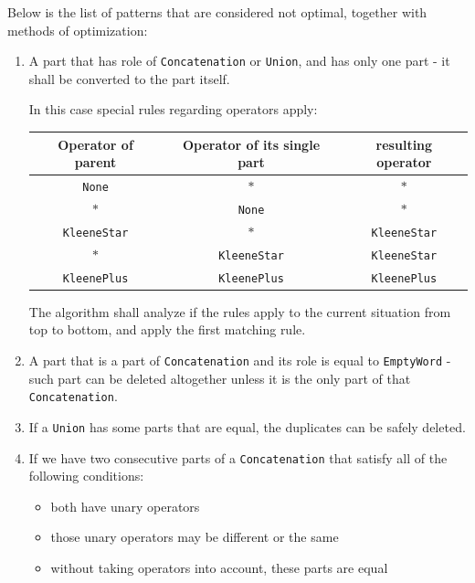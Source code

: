\documentclass{article}
\begin{document}
Below is the list of patterns that are considered not optimal, together with methods of optimization:
\begin{enumerate}

  \item A part that has role of \verb|Concatenation| or \verb|Union|, and has only one part - it
  shall be converted to the part itself.

  In this case special rules regarding operators apply:

  \noindent
  \begin{tabular}{c|c|c}
  Operator of parent & Operator of its single part & resulting operator \\ \hline
  \verb|None| & $*$ & $*$ \\
  $*$ & \verb|None| & $*$ \\
  \verb|KleeneStar| & $*$ & \verb|KleeneStar| \\
  $*$ & \verb|KleeneStar| & \verb|KleeneStar| \\
  \verb|KleenePlus| & \verb|KleenePlus| & \verb|KleenePlus| \\
  \end{tabular}

  \vspace{10pt} The algorithm shall analyze if the rules apply to the current situation from top to
  bottom, and apply the first matching rule.

  \item A part that is a part of \verb|Concatenation| and its role is equal to \verb|EmptyWord| -
  such part can be deleted altogether unless it is the only part of that \verb|Concatenation|.

  \item If a \verb|Union| has some parts that are equal, the duplicates can be safely deleted.

  \item If we have two consecutive parts of a \verb|Concatenation| that satisfy all of the following conditions:

  \begin{itemize}

    \item both have unary operators

    \item those unary operators may be different or the same

    \item without taking operators into account, these parts are equal


\end{itemize}
\end{enumerate}
\end{document}
